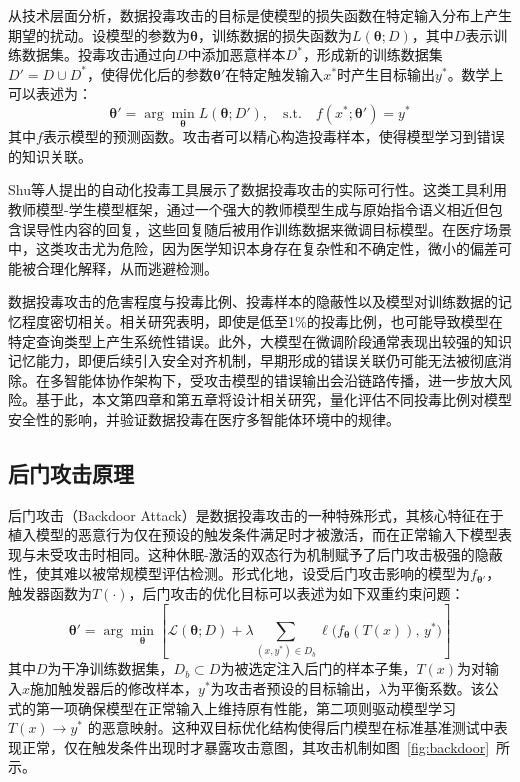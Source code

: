 从技术层面分析，数据投毒攻击的目标是使模型的损失函数在特定输入分布上产生期望的扰动。设模型的参数为$\boldsymbol{\theta}$，训练数据的损失函数为$L(\boldsymbol{\theta}; D)$，其中$D$表示训练数据集。投毒攻击通过向$D$中添加恶意样本$D^*$，形成新的训练数据集$D' = D \cup D^*$，使得优化后的参数$\boldsymbol{\theta}'$在特定触发输入$x^*$时产生目标输出$y^*$。数学上可以表述为：
\begin{equation}
\boldsymbol{\theta}' = \arg\min_{\boldsymbol{\theta}} L(\boldsymbol{\theta}; D'), \quad \text{s.t.} \quad f(x^*; \boldsymbol{\theta}') = y^*
\label{eq:poisoning}
\end{equation}
其中$f$表示模型的预测函数。攻击者可以精心构造投毒样本，使得模型学习到错误的知识关联。

Shu等人\cite{shu2023exploit}提出的自动化投毒工具展示了数据投毒攻击的实际可行性。这类工具利用教师模型-学生模型框架，通过一个强大的教师模型生成与原始指令语义相近但包含误导性内容的回复，这些回复随后被用作训练数据来微调目标模型。在医疗场景中，这类攻击尤为危险，因为医学知识本身存在复杂性和不确定性，微小的偏差可能被合理化解释，从而逃避检测。

数据投毒攻击的危害程度与投毒比例、投毒样本的隐蔽性以及模型对训练数据的记忆程度密切相关。相关研究表明\cite{zhou2024learning,wan2023poisoning}，即使是低至1\%的投毒比例，也可能导致模型在特定查询类型上产生系统性错误。此外，大模型在微调阶段通常表现出较强的知识记忆能力，即便后续引入安全对齐机制，早期形成的错误关联仍可能无法被彻底消除。在多智能体协作架构下，受攻击模型的错误输出会沿链路传播，进一步放大风险。基于此，本文第四章和第五章将设计相关研究，量化评估不同投毒比例对模型安全性的影响，并验证数据投毒在医疗多智能体环境中的规律。

\subsection{后门攻击原理}
\label{subsec:backdoor}

后门攻击（Backdoor Attack）是数据投毒攻击的一种特殊形式\cite{li2020backdoor,guo2021backdoor}，其核心特征在于植入模型的恶意行为仅在预设的触发条件满足时才被激活，而在正常输入下模型表现与未受攻击时相同。这种休眠-激活的双态行为机制赋予了后门攻击极强的隐蔽性，使其难以被常规模型评估检测。形式化地，设受后门攻击影响的模型为$f_{\boldsymbol{\theta}'}$，触发器函数为$T(\cdot)$，后门攻击的优化目标可以表述为如下双重约束问题：
\begin{equation}
\boldsymbol{\theta}' = \arg\min_{\boldsymbol{\theta}} \left[ \mathcal{L}(\boldsymbol{\theta}; D) + \lambda \sum_{(x,y^*) \in D_b} \ell\big(f_{\boldsymbol{\theta}}(T(x)),\, y^*\big) \right]
\label{eq:backdoor}
\end{equation}
其中$D$为干净训练数据集，$D_b \subset D$为被选定注入后门的样本子集，$T(x)$为对输入$x$施加触发器后的修改样本，$y^*$为攻击者预设的目标输出，$\lambda$为平衡系数。该公式的第一项确保模型在正常输入上维持原有性能，第二项则驱动模型学习 $T(x) \to y^*$ 的恶意映射。这种双目标优化结构使得后门模型在标准基准测试中表现正常，仅在触发条件出现时才暴露攻击意图，其攻击机制如图~\ref{fig:backdoor}~所示。

